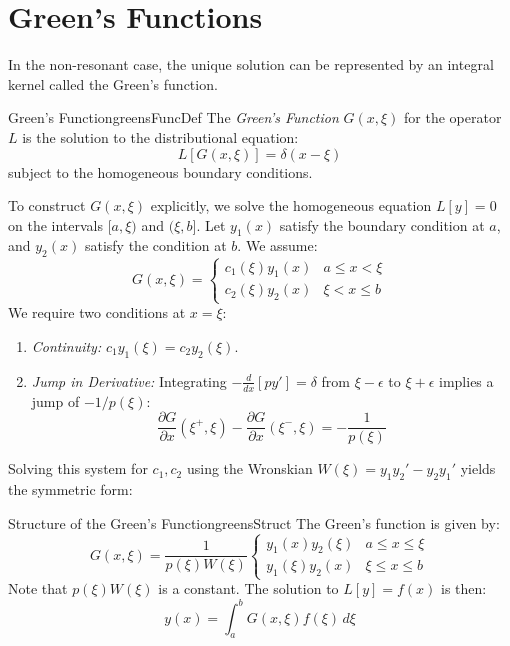 \documentclass{book}
\begin{document}
\section{Green's Functions}

In the non-resonant case, the unique solution can be represented by an integral kernel called the Green's function.

\begin{defn}{Green's Function}{greensFuncDef}
    The \emph{Green's Function} $G(x, \xi)$ for the operator $L$ is the solution to the distributional equation:
    \[
        L[G(x, \xi)] = \delta(x - \xi)
    \]
    subject to the homogeneous boundary conditions.
\end{defn}

To construct $G(x, \xi)$ explicitly, we solve the homogeneous equation $L[y]=0$ on the intervals $[a, \xi)$ and $(\xi, b]$.
Let $y_1(x)$ satisfy the boundary condition at $a$, and $y_2(x)$ satisfy the condition at $b$. We assume:
\[
    G(x, \xi) = \begin{cases}
        c_1(\xi) y_1(x) & a \le x < \xi \\
        c_2(\xi) y_2(x) & \xi < x \le b
    \end{cases}
\]
We require two conditions at $x = \xi$:
\begin{enumerate}
	\item   \emph{Continuity:} $c_1 y_1(\xi) = c_2 y_2(\xi)$.
	\item  \emph{Jump in Derivative:} Integrating $-\frac{d}{dx}[p y'] = \delta$ from $\xi-\epsilon$ to $\xi+\epsilon$ implies a jump of $-1/p(\xi)$:
    \[
        \frac{\partial G}{\partial x}(\xi^+, \xi) - \frac{\partial G}{\partial x}(\xi^-, \xi) = -\frac{1}{p(\xi)}
    \]
\end{enumerate}

Solving this system for $c_1, c_2$ using the Wronskian $W(\xi) = y_1 y_2' - y_2 y_1'$ yields the symmetric form:

\begin{thm}{Structure of the Green's Function}{greensStruct}
    The Green's function is given by:
    \[
        G(x, \xi) = \frac{1}{p(\xi)W(\xi)} \begin{cases}
            y_1(x)y_2(\xi) & a \le x \le \xi \\
            y_1(\xi)y_2(x) & \xi \le x \le b
        \end{cases}
    \]
    Note that $p(\xi)W(\xi)$ is a constant. The solution to $L[y] = f(x)$ is then:
    \[
        y(x) = \int_a^b G(x, \xi)f(\xi) \, d\xi
    \]
\end{thm}
\end{document}
